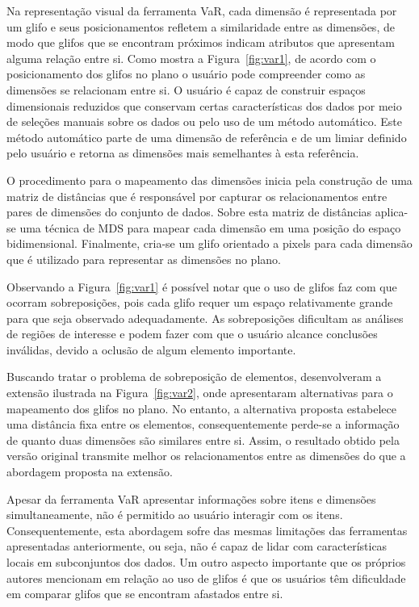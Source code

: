 Na representação visual da ferramenta VaR, cada dimensão é
representada por um glifo e seus posicionamentos refletem a
similaridade entre as dimensões, de modo que glifos que se
encontram próximos indicam atributos que apresentam alguma
relação entre si. Como mostra a Figura~\ref{fig:var1}, de
acordo com o posicionamento dos glifos no plano o usuário
pode compreender como as dimensões se relacionam entre si. O
usuário é capaz de construir espaços dimensionais reduzidos
que conservam certas características dos dados por meio de
seleções manuais sobre os dados ou pelo uso de um método automático.
Este método automático parte de uma dimensão de referência e
de um limiar definido pelo usuário e retorna as dimensões
mais semelhantes à esta referência.

O procedimento para o mapeamento das dimensões inicia
pela construção de uma matriz de distâncias que é
responsável por capturar os relacionamentos entre pares de
dimensões do conjunto de dados. Sobre esta matriz de
distâncias aplica-se uma técnica de MDS para mapear cada
dimensão em uma posição do espaço bidimensional.
Finalmente, cria-se um glifo orientado a pixels para cada
dimensão que é utilizado para representar as dimensões
no plano.

Observando a Figura~\ref{fig:var1} é possível notar que o
uso de glifos faz com que ocorram sobreposições, pois cada
glifo requer um espaço relativamente grande para que seja
observado adequadamente.  As sobreposições dificultam as
análises de regiões de interesse e podem fazer com que o
usuário alcance conclusões inválidas, devido a oclusão de
algum elemento importante.  

Buscando tratar o problema de sobreposição de elementos,
\citet{Yang2007} desenvolveram a extensão ilustrada na
Figura~\ref{fig:var2}, onde apresentaram alternativas para o
mapeamento dos glifos no plano. No entanto, a alternativa
proposta estabelece uma distância fixa entre os elementos,
consequentemente perde-se a informação de quanto duas
dimensões são similares entre si. Assim, o resultado obtido
pela versão original transmite melhor os relacionamentos entre
as dimensões do que a abordagem proposta na extensão. 

Apesar da ferramenta VaR apresentar informações sobre itens
e dimensões simultaneamente, não é permitido ao usuário
interagir com os itens. Consequentemente, esta abordagem
sofre das mesmas limitações das ferramentas apresentadas
anteriormente, ou seja, não é capaz de lidar com  
características locais em subconjuntos dos dados. Um outro
aspecto importante que os próprios autores mencionam em
relação ao uso de glifos é que os usuários têm dificuldade
em comparar glifos que se encontram afastados entre si. 

